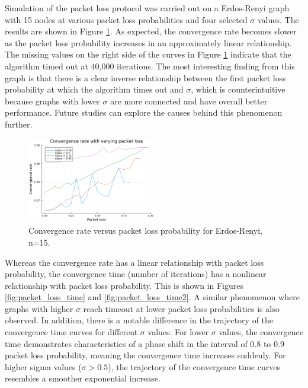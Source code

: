 \documentclass[conference]{IEEEtran}
\begin{document}
Simulation of the packet loss protocol was carried out on a Erdos-Renyi graph with 15 nodes at various packet loss probabilities and four selected 
$\sigma$ values. The results are shown in Figure \ref{fig:packet_loss}. As expected, the convergence rate becomes slower as the packet loss probability increases
in an approximately linear relationship. The missing values on the right side of the curves in Figure \ref{fig:packet_loss} indicate that the algorithm timed out at
40,000 iterations. The most interesting finding from this graph is that there is a clear inverse relationship between the first packet loss probability at which the algorithm 
times out and $\sigma$, which is counterintuitive because graphs with lower $\sigma$ are more connected and have overall better performance. Future 
studies can explore the causes behind this phenomenon further. 

\begin {figure}[h]
    \centering
    \includegraphics[width=0.5\textwidth]{s-er-pl-rate.png}
    \caption{Convergence rate versus packet loss probability for Erdos-Renyi, n=15.}
    \label{fig:packet_loss}
\end{figure}

Whereas the convergence rate has a linear relationship with packet loss probability, the convergence time (number of iterations) has a nonlinear relationship
with packet loss probability. This is shown in Figures \ref{fig:packet_loss_time} and \ref{fig:packet_loss_time2}. A similar phenomenon where graphs with higher $\sigma$ reach timeout at lower packet loss 
probabilities is also observed. In addition, there is a notable difference in the trajectory of the convergence time curves for different $\sigma$ values. For lower 
$\sigma$ values, the convergence time demonstrates characteristics of a phase shift in the interval of 0.8 to 0.9 packet loss probability, meaning the 
convergence time increases suddenly. For higher sigma values ($\sigma > 0.5$), the trajectory of the convergence time curves resembles a smoother exponential 
increase. 
\end{document}
